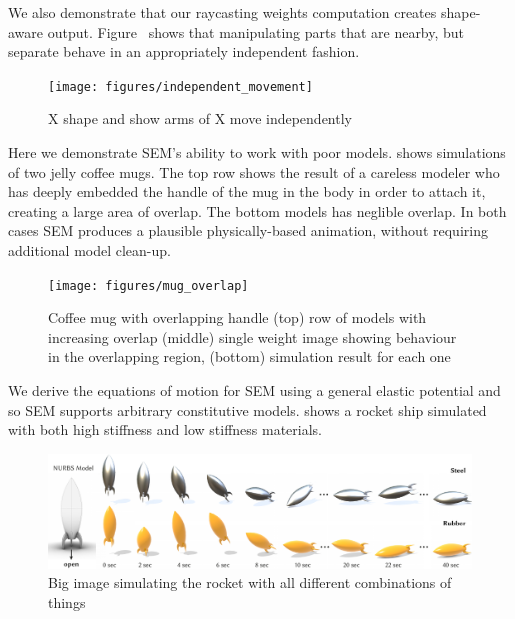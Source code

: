 We also demonstrate that our raycasting weights computation creates shape-aware output. Figure~ shows that manipulating
parts that are nearby, but separate  behave in an appropriately independent fashion. 
\begin{figure}[h]
  \texttt{[image: figures/independent\_movement]}
  \caption{X shape and show arms of X move independently}
  \label{fig:independence}
\end{figure}

Here we demonstrate SEM's ability to work with poor models.  shows simulations of two jelly coffee mugs. 
The top row shows the result of a careless modeler who has deeply embedded the handle of the mug in the body in order to attach it, creating a large area of overlap.
The bottom models has neglible overlap. 
In both cases SEM produces a plausible physically-based animation, without requiring additional model clean-up.
\begin{figure}[h]
  \texttt{[image: figures/mug\_overlap]}
  \caption{Coffee mug with overlapping handle (top) row of models with increasing overlap (middle) single weight image showing behaviour in the overlapping region, (bottom) simulation result for each one}
  \label{fig:badmodels}
\end{figure}

We derive the equations of motion for SEM using a general elastic potential and so SEM supports arbitrary constitutive models.  shows a 
rocket ship simulated with both high stiffness and low stiffness materials. 
\begin{figure}[htp]
  \includegraphics[width=\textwidth]{figures/rocket.pdf}
  \caption{Big image simulating the rocket with all different combinations of things}
  \label{fig:rocket}
\end{figure}


